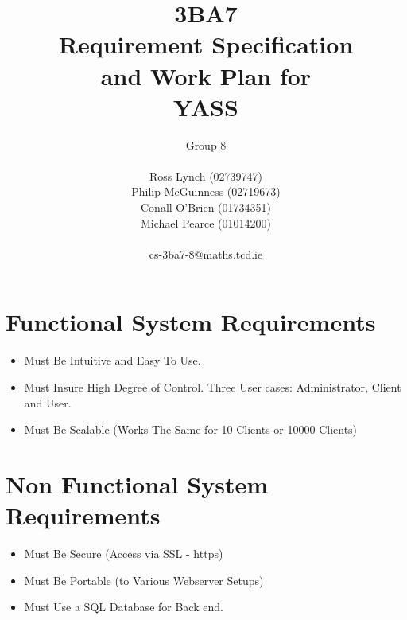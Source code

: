 \documentclass[a4paper,12pt]{article}
\begin{document}
\title{3BA7 \\ Requirement Specification \\ and Work Plan for \\ YASS}

\author{Group 8 \\ \\ Ross Lynch (02739747) \\ Philip McGuinness (02719673) \\ Conall O'Brien (01734351) \\ Michael Pearce (01014200) \\ \\ cs-3ba7-8@maths.tcd.ie}

\maketitle

\section{Functional System Requirements}

\begin{itemize}

\item Must Be Intuitive and Easy To Use.

\item Must Insure High Degree of Control. Three User cases:
Administrator, Client and User.

\item Must Be Scalable (Works The Same for 10 Clients or 10000 Clients)

\end{itemize}

\section{Non Functional System Requirements}

\begin{itemize}

\item Must Be Secure (Access via SSL - https)

\item Must Be Portable (to Various Webserver Setups)

\item Must Use a SQL Database for Back end.

\end{itemize}
\end{document}
